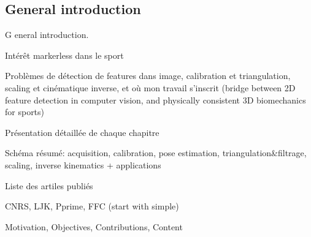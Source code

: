 {}

\vspace*{-1cm}
\begin{flushright}
\section*{\fontsize{20pt}{20pt}\selectfont\textnormal{General introduction}}
\end{flushright}
\vspace{2cm}

\chead[\fancyplain{}{}]
      {\fancyplain{}{}}
\lfoot[\fancyplain{}{}]%
      {\fancyplain{}{}}
\cfoot[\fancyplain{}{\thepage}]
      {\fancyplain{}{\thepage}}
\rfoot[\fancyplain{}{}]%
     {\fancyplain{}{\scriptsize}}
     


\lettrine[lines=1]{G}{ }eneral introduction.


Intérêt markerless dans le sport

Problèmes de détection de features dans image, calibration et triangulation, scaling et cinématique inverse, et où mon travail s'inscrit (bridge between 2D feature detection in computer vision, and physically consistent 3D biomechanics for sports)

Présentation détaillée de chaque chapitre

Schéma résumé: acquisition, calibration, pose estimation, triangulation\&filtrage, scaling, inverse kinematics + applications

Liste des artiles publiés



CNRS, LJK, Pprime, FFC (start with simple)

Motivation,
Objectives,
Contributions,
Content
